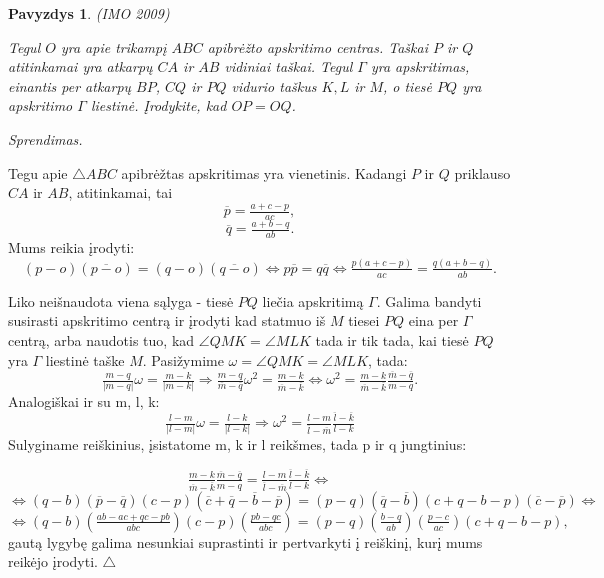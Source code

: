 \documentclass[11pt,a4paper,twoside]{book}
\newenvironment{sprendimas}{\noindent \textit{Sprendimas.}}{\hfill $\triangle$}
\newcounter{foo}[subsection]
\newtheorem{pavnr}[foo]{Pavyzdys}
\theoremstyle{definition} \newtheorem*{api}{Apibrėžimas}
\theoremstyle{remark} \newtheorem*{pastaba}{Pastaba}
\begin{document}
\begin{pavnr}
(IMO 2009)

Tegul $O$ yra apie trikampį $ABC$ apibrėžto apskritimo centras. Taškai $P$ ir $Q$ atitinkamai yra atkarpų $CA$ ir $AB$ vidiniai taškai. Tegul $\Gamma$ yra apskritimas, einantis per atkarpų $BP$, $CQ$ ir $PQ$ vidurio taškus $K, L$ ir $M$, o tiesė $PQ$ yra apskritimo $\Gamma$ liestinė. Įrodykite, kad $OP = OQ$.
\end{pavnr}
\begin{sprendimas}

Tegu apie $\bigtriangleup ABC$ apibrėžtas apskritimas yra vienetinis. Kadangi $P$ ir $Q$ priklauso $CA$ ir $AB$, atitinkamai, tai
$$\overline{p}=\tfrac{a+c-p}{ac},$$
$$\overline{q}=\tfrac{a+b-q}{ab}.$$
Mums reikia įrodyti:
$$(p-o)(\overline{p-o})=(q-o)(\overline{q-o}) \Leftrightarrow p\overline{p}=q\overline{q} \Leftrightarrow \tfrac{p(a+c-p)}{ac}=\tfrac{q(a+b-q)}{ab}.$$

Liko neišnaudota viena sąlyga - tiesė $PQ$ liečia apskritimą $\Gamma$. Galima bandyti susirasti apskritimo centrą ir įrodyti kad statmuo iš $M$ tiesei $PQ$ eina per $\Gamma$ centrą, arba naudotis tuo, kad $\angle QMK=\angle MLK$ tada ir tik tada, kai tiesė $PQ$ yra $\Gamma$ liestinė taške $M$. Pasižymime $\omega=\angle QMK=\angle MLK$, tada:
$$\tfrac{m-q}{|m-q|}\omega=\tfrac{m-k}{|m-k|} \Rightarrow \tfrac{m-q}{\overline{m}-\overline{q}}\omega^2=\tfrac{m-k}{\overline{m}-\overline{k}} \Leftrightarrow \omega^2=\tfrac{m-k}{\overline{m}-\overline{k}} \tfrac{\overline{m}-\overline{q}}{m-q}.$$
Analogiškai ir su m, l, k:
$$\tfrac{l-m}{|l-m|}\omega=\tfrac{l-k}{|l-k|} \Rightarrow  \omega^2=\tfrac{l-m}{\overline{l}-\overline{m}}\tfrac{\overline{l}-\overline{k}}{l-k}$$
Sulyginame reiškinius, įsistatome m, k ir l reikšmes, tada p ir q jungtinius:

\begin{equation*}
 \tfrac{m-k}{\overline{m}-\overline{k}} \tfrac{\overline{m}-\overline{q}}{m-q}=\tfrac{l-m}{\overline{l}-\overline{m}}\tfrac{\overline{l}-\overline{k}}{l-k} \Leftrightarrow 
\end{equation*}
\begin{equation*}
 \Leftrightarrow (q-b)(\overline{p}-\overline{q})(c-p)(\overline{c}+\overline{q}-\overline{b}-\overline{p})=(p-q)(\overline{q}-\overline{b})(c+q-b-p)(\overline{c}-\overline{p}) \Leftrightarrow
\end{equation*}
\begin{equation*}
\Leftrightarrow (q-b)(\tfrac{ab-ac+qc-pb}{abc})(c-p)(\tfrac{pb-qc}{abc})=(p-q)(\tfrac{b-q}{ab})(\tfrac{p-c}{ac})(c+q-b-p),
\end{equation*}
gautą lygybę galima nesunkiai suprastinti ir pertvarkyti į reiškinį, kurį mums reikėjo įrodyti.
\end{sprendimas}
\end{document}
